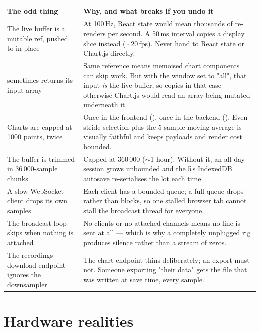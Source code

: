 \documentclass[11pt,a4paper]{article}
\begin{document}
\begin{center}
\begin{tabular}{@{}L{5.0cm}L{10.2cm}@{}}
\toprule
\textbf{The odd thing} & \textbf{Why, and what breaks if you undo it} \\
\midrule
The live buffer is a mutable ref, pushed to in place &
  At 100\,Hz, React state would mean thousands of re-renders per second. A
  50\,ms interval copies a display slice instead ($\sim$20\,fps). Never hand
   to React state or Chart.js directly. \\
 sometimes returns its input array &
  Same reference means memoised chart components can skip work. But with the
  window set to "all", that input \emph{is} the live buffer, so
   copies in that case --- otherwise Chart.js would read
  an array being mutated underneath it. \\
Charts are capped at 1000 points, twice &
  Once in the frontend (), once in the backend
  (). Even-stride selection plus the 5-sample moving
  average is visually faithful and keeps payloads and render cost bounded. \\
The buffer is trimmed in 36\,000-sample chunks &
  Capped at 360\,000 ($\sim$1 hour). Without it, an all-day session grows
  unbounded and the 5\,s IndexedDB autosave re-serialises the lot each time. \\
A slow WebSocket client drops its own samples &
  Each client has a bounded queue; a full queue drops rather than blocks, so one
  stalled browser tab cannot stall the broadcast thread for everyone. \\
The broadcast loop skips when nothing is attached &
  No clients or no attached channels means no line is sent at all --- which is
  why a completely unplugged rig produces silence rather than a stream of zeros. \\
The recordings download endpoint ignores the downsampler &
  The chart endpoint thins deliberately; an export must not. Someone exporting
  "their data" gets the file that was written at save time, every sample. \\
\bottomrule
\end{tabular}
\end{center}

\section{Hardware realities}
\end{document}
